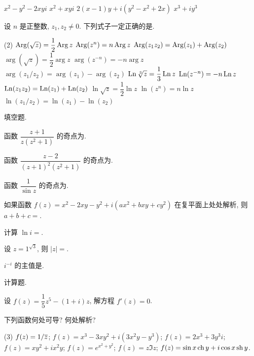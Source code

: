 \begin{homework}
\begin{exlist}
\begin{taskschoice}
          \task $x^2-y^2-2xyi$
          \task $x^2+xyi$
          \task $2(x-1)y+i(y^2-x^2+2x)$
          \task $x^3+iy^3$
        \end{taskschoice}
      \item 设 $n$ 是正整数, $z_1,z_2\neq0$. 下列式子一定正确的是\fillbrace{}.
        \begin{taskschoice}(2)
          \task $\operatorname{Arg}(\sqrt z)=\dfrac12\operatorname{Arg} z$
          \task $\operatorname{Arg}(z^n)=n\operatorname{Arg} z$
          \task $\operatorname{Arg}(z_1z_2)=\operatorname{Arg}(z_1)+\operatorname{Arg}(z_2)$
          \task $\arg(\sqrt z)=\dfrac12\arg z$
          \task $\arg(z^{-n})=-n\arg z$
          \task $\arg(z_1/z_2)=\arg(z_1)-\arg(z_2)$
          \task $\operatorname{Ln}\sqrt[3] z=\dfrac13\operatorname{Ln} z$
          \task $\operatorname{Ln}(z^{-n})=-n\operatorname{Ln} z$
          \task $\operatorname{Ln}(z_1z_2)=\operatorname{Ln}(z_1)+\operatorname{Ln}(z_2)$
          \task $\ln\sqrt z=\dfrac12\ln z$
          \task $\ln(z^n)=n\ln z$
          \task $\ln(z_1/z_2)=\ln(z_1)-\ln(z_2)$
        \end{taskschoice}
    \end{exlist}
  \item 填空题.
    \begin{exlist}
      \item 函数 $\dfrac{z+1}{z(z^2+1)}$ 的奇点为\fillblank{}.
      \item 函数 $\dfrac{z-2}{(z+1)^2(z^2+1)}$ 的奇点为\fillblank{}.
      \item 函数 $\dfrac{1}{\sin z}$ 的奇点为\fillblank{}.
      \item 如果函数 $f(z)=x^2-2xy-y^2+i(ax^2+bxy+cy^2)$ 在复平面上处处解析, 则 $a+b+c=$\fillblank{}.
      \item 计算 $\ln i=$\fillblank[2cm]{}.
      \item 设 $z=1^{\sqrt3}$, 则 $|z|=$\fillblank{}.
      \item $i^{-i}$ 的主值是\fillblank{}.
    \end{exlist}
  \item 计算题.
    \begin{exlist}
      \item 设 $f(z)=\dfrac15z^5-(1+i)z$, 解方程 $f'(z)=0$.
      \item 下列函数何处可导? 何处解析?
        \begin{tasks}(3)
          \task $f(z)=1/\overline z$;
          \task* $f(z)=x^3-3xy^2+i(3x^2y-y^3)$;
          \task $f(z)=2x^3+3y^3i$;
          \task $f(z)=xy^2+ix^2y$;
          \task $f(z)=e^{x^2+y^2}$;
          \task $f(z)=z\Im z$;
          \task* $f(z)=\sin x\operatorname{ch} y+i\cos x\operatorname{sh} y$.
        \end{tasks}

\end{exlist}
\end{homework}
